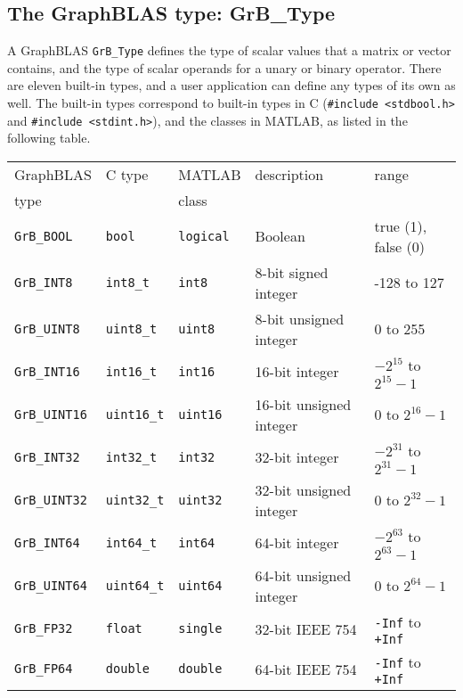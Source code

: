 \documentclass[12pt]{article}
\begin{document}
\subsection{The GraphBLAS type: {\sf GrB\_Type}} %
\label{type}

A GraphBLAS \verb'GrB_Type' defines the type of scalar values that a matrix or
vector contains, and the type of scalar operands for a unary or binary
operator.  There are eleven built-in types, and a user application can define
any types of its own as well.  The built-in types correspond to built-in types
in C (\verb'#include <stdbool.h>' and \verb'#include <stdint.h>'), and the
classes in MATLAB, as listed in the following table.

\vspace{0.2in}
\noindent
{\footnotesize
\begin{tabular}{lllll}
\hline
GraphBLAS         & C type           & MATLAB         & description              & range \\
type              &                  & class          &                          & \\
\hline
\verb'GrB_BOOL'   & \verb'bool'      & \verb'logical' & Boolean                  & true (1), false (0) \\
\hline
\verb'GrB_INT8'   & \verb'int8_t'    & \verb'int8'    & 8-bit signed integer     & -128 to 127 \\
\verb'GrB_UINT8'  & \verb'uint8_t'   & \verb'uint8'   & 8-bit unsigned integer   & 0 to 255 \\
\hline
\verb'GrB_INT16'  & \verb'int16_t'   & \verb'int16'   & 16-bit integer           & $-2^{15}$ to $2^{15}-1$ \\
\verb'GrB_UINT16' & \verb'uint16_t'  & \verb'uint16'  & 16-bit unsigned integer  & 0 to $2^{16}-1$ \\
\hline
\verb'GrB_INT32'  & \verb'int32_t'   & \verb'int32'   & 32-bit integer           & $-2^{31}$ to $2^{31}-1$ \\
\verb'GrB_UINT32' & \verb'uint32_t'  & \verb'uint32'  & 32-bit unsigned integer  & 0 to $2^{32}-1$ \\
\hline
\verb'GrB_INT64'  & \verb'int64_t'   & \verb'int64'   & 64-bit integer           & $-2^{63}$ to $2^{63}-1$ \\
\verb'GrB_UINT64' & \verb'uint64_t'  & \verb'uint64'  & 64-bit unsigned integer  & 0 to $2^{64}-1$ \\
\hline
\verb'GrB_FP32'   & \verb'float'     & \verb'single'  & 32-bit IEEE 754          & \verb'-Inf' to \verb'+Inf'\\
\verb'GrB_FP64'   & \verb'double'    & \verb'double'  & 64-bit IEEE 754          & \verb'-Inf' to \verb'+Inf'\\
\hline
\end{tabular}
}
\vspace{0.2in}
\end{document}

